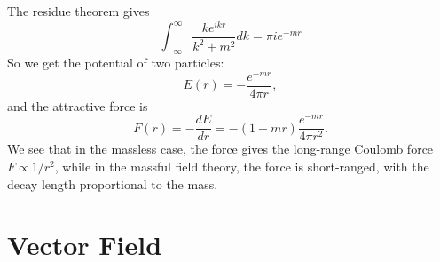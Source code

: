 The residue theorem gives
\begin{equation}
	\int_{-\infty}^\infty \frac{k e^{ikr}}{k^2 +m^2} dk = \pi ie^{-mr}
\end{equation}
So we get the potential of two particles:
\begin{equation}
	E(r) = -\frac{e^{-mr}}{4\pi r},
\end{equation}
and the attractive force is
\begin{equation}
	F(r) = -\frac{dE}{dr} = -(1+mr)\frac{e^{-mr}}{4\pi r^2}.
\end{equation}
We see that in the massless case, the force gives the long-range Coulomb force $F \propto 1/r^2$, while in the massful field theory, the force is short-ranged, with the decay length proportional to the mass.




\section{Vector Field}

